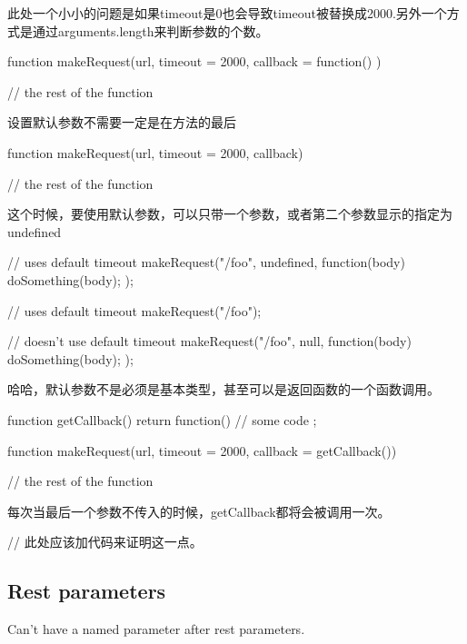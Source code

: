 此处一个小小的问题是如果timeout是0也会导致timeout被替换成2000.另外一个方式是通过arguments.length来判断参数的个数。

\begin{JavaScript}
function makeRequest(url, timeout = 2000, callback = function() {}) {

    // the rest of the function

}
\end{JavaScript}

设置默认参数不需要一定是在方法的最后
\begin{JavaScript}[这样也是可以的]
function makeRequest(url, timeout = 2000, callback) {

    // the rest of the function

}
\end{JavaScript}

这个时候，要使用默认参数，可以只带一个参数，或者第二个参数显示的指定为undefined
\begin{JavaScript}
// uses default timeout
makeRequest("/foo", undefined, function(body) {
    doSomething(body);
});

// uses default timeout
makeRequest("/foo");

// doesn't use default timeout
makeRequest("/foo", null, function(body) {
    doSomething(body);
});
\end{JavaScript}

哈哈，默认参数不是必须是基本类型，甚至可以是返回函数的一个函数调用。
\begin{JavaScript}[函数调用返回函数的默认值]
function getCallback() {
    return function() {
        // some code
    };
}

function makeRequest(url, timeout = 2000, callback = getCallback()) {

    // the rest of the function

}
\end{JavaScript}

每次当最后一个参数不传入的时候，getCallback都将会被调用一次。

\begin{JavaScript}
// 此处应该加代码来证明这一点。
\end{JavaScript}

\subsection{Rest parameters}

Can't have a named parameter after rest parameters.

